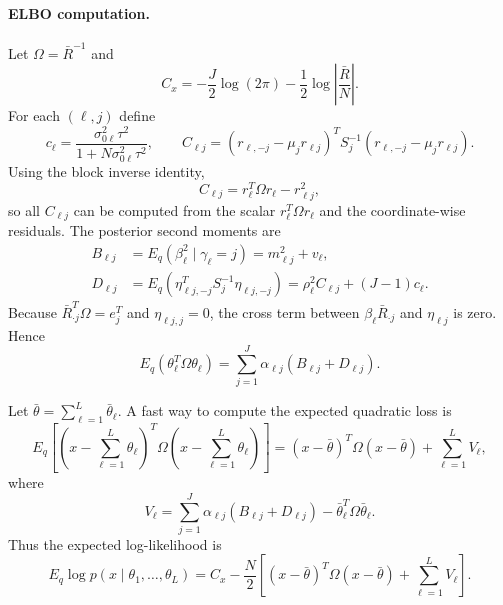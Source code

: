 \documentclass[11pt]{article}
\begin{document}
\paragraph{ELBO computation.}
Let $\Omega=\bar R^{-1}$ and
\[
C_x=-\frac{J}{2}\log(2\pi)-\frac12\log\left|\frac{\bar R}{N}\right|.
\]
For each $(\ell,j)$ define
\[
c_\ell
=
\frac{\sigma_{0\ell}^2\tau^2}
{1+N\sigma_{0\ell}^2\tau^2},
\qquad
C_{\ell j}
=
(r_{\ell,-j}-\mu_jr_{\ell j})^TS_j^{-1}
(r_{\ell,-j}-\mu_jr_{\ell j}).
\]
Using the block inverse identity,
\[
C_{\ell j}=r_\ell^T\Omega r_\ell-r_{\ell j}^2,
\]
so all $C_{\ell j}$ can be computed from the scalar
$r_\ell^T\Omega r_\ell$ and the coordinate-wise residuals. The posterior
second moments are
\begin{align}
B_{\ell j}
&=
E_q(\beta_\ell^2\mid\gamma_\ell=j)
=m_{\ell j}^2+v_\ell,\\
D_{\ell j}
&=
E_q(\eta_{\ell j,-j}^TS_j^{-1}\eta_{\ell j,-j})
=
\rho_\ell^2C_{\ell j}+(J-1)c_\ell.
\end{align}
Because $\bar R_{\cdot j}^T\Omega=e_j^T$ and $\eta_{\ell j,j}=0$, the cross
term between $\beta_\ell\bar R_{\cdot j}$ and $\eta_{\ell j}$ is zero. Hence
\[
E_q(\theta_\ell^T\Omega\theta_\ell)
=
\sum_{j=1}^J\alpha_{\ell j}(B_{\ell j}+D_{\ell j}).
\]

Let $\bar\theta=\sum_{\ell=1}^L\bar\theta_\ell$. A fast way to compute the
expected quadratic loss is
\[
E_q\left[
(x-\sum_{\ell=1}^L\theta_\ell)^T
\Omega
(x-\sum_{\ell=1}^L\theta_\ell)
\right]
=
(x-\bar\theta)^T\Omega(x-\bar\theta)
+\sum_{\ell=1}^L V_\ell,
\]
where
\[
V_\ell
=
\sum_{j=1}^J\alpha_{\ell j}(B_{\ell j}+D_{\ell j})
-\bar\theta_\ell^T\Omega\bar\theta_\ell.
\]
Thus the expected log-likelihood is
\[
E_q\log p(x\mid\theta_1,\ldots,\theta_L)
=
C_x-\frac{N}{2}
\left[
(x-\bar\theta)^T\Omega(x-\bar\theta)
+\sum_{\ell=1}^L V_\ell
\right].
\]
\end{document}
